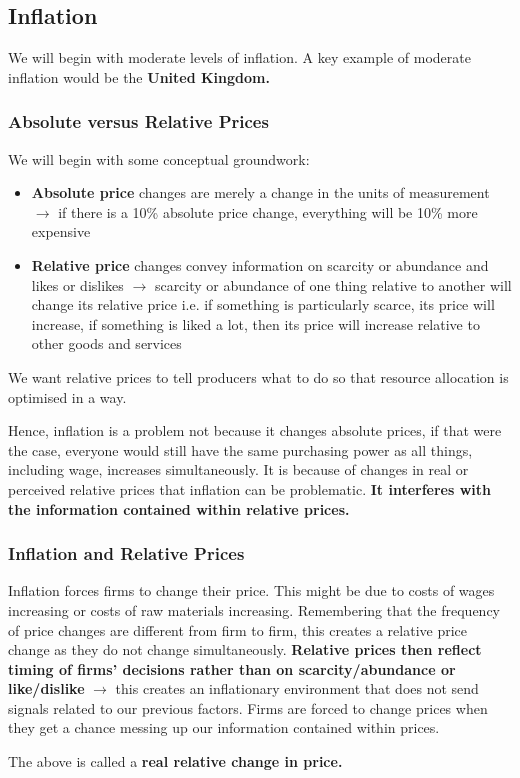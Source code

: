 \documentclass[12pt, letterpaper]{article}
\begin{document}
\subsection{Inflation}
We will begin with moderate levels of inflation. A key example of moderate inflation would be the \textbf{United Kingdom.}
\subsubsection{Absolute versus Relative Prices}
We will begin with some conceptual groundwork:
\begin{itemize}
	\item \textbf{Absolute price} changes are merely a change in the units of measurement $\rightarrow$ if there is a 10\% absolute price change, everything will be 10\% more expensive
	\item \textbf{Relative price} changes convey information on scarcity or abundance and likes or dislikes $\rightarrow$ scarcity or abundance of one thing relative to another will change its relative price i.e. if something is particularly scarce, its price will increase, if something is liked a lot, then its price will increase relative to other goods and services
\end{itemize}
We want relative prices to tell producers what to do so that resource allocation is optimised in a way.

Hence, inflation is a problem not because it changes absolute prices, if that were the case, everyone would still have the same purchasing power as all things, including wage, increases simultaneously. It is because of changes in real or perceived relative prices that inflation can be problematic. \textbf{It interferes with the information contained within relative prices.}

\subsubsection{Inflation and Relative Prices}
Inflation forces firms to change their price. This might be due to costs of wages increasing or costs of raw materials increasing. Remembering that the frequency of price changes are different from firm to firm, this creates a relative price change as they do not change simultaneously. \textbf{Relative prices then reflect timing of firms' decisions rather than on scarcity/abundance or like/dislike} $\rightarrow$ this creates an inflationary environment that does not send signals related to our previous factors. Firms are forced to change prices when they get a chance messing up our information contained within prices.
\begin{center}
\noindent{}
\end{center}
The above is called a \textbf{real relative change in price.}\\
\end{document}
